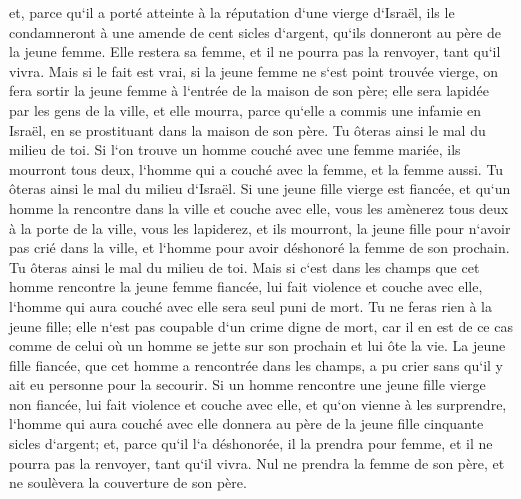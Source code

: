 \verse et, parce qu`il a porté atteinte à la réputation d`une vierge d`Israël, ils le condamneront à une amende de cent sicles d`argent, qu`ils donneront au père de la jeune femme. Elle restera sa femme, et il ne pourra pas la renvoyer, tant qu`il vivra. 
\verse Mais si le fait est vrai, si la jeune femme ne s`est point trouvée vierge, 
\verse on fera sortir la jeune femme à l`entrée de la maison de son père; elle sera lapidée par les gens de la ville, et elle mourra, parce qu`elle a commis une infamie en Israël, en se prostituant dans la maison de son père. Tu ôteras ainsi le mal du milieu de toi. 
\verse Si l`on trouve un homme couché avec une femme mariée, ils mourront tous deux, l`homme qui a couché avec la femme, et la femme aussi. Tu ôteras ainsi le mal du milieu d`Israël. 
\verse Si une jeune fille vierge est fiancée, et qu`un homme la rencontre dans la ville et couche avec elle, 
\verse vous les amènerez tous deux à la porte de la ville, vous les lapiderez, et ils mourront, la jeune fille pour n`avoir pas crié dans la ville, et l`homme pour avoir déshonoré la femme de son prochain. Tu ôteras ainsi le mal du milieu de toi. 
\verse Mais si c`est dans les champs que cet homme rencontre la jeune femme fiancée, lui fait violence et couche avec elle, l`homme qui aura couché avec elle sera seul puni de mort. 
\verse Tu ne feras rien à la jeune fille; elle n`est pas coupable d`un crime digne de mort, car il en est de ce cas comme de celui où un homme se jette sur son prochain et lui ôte la vie. 
\verse La jeune fille fiancée, que cet homme a rencontrée dans les champs, a pu crier sans qu`il y ait eu personne pour la secourir. 
\verse Si un homme rencontre une jeune fille vierge non fiancée, lui fait violence et couche avec elle, et qu`on vienne à les surprendre, 
\verse l`homme qui aura couché avec elle donnera au père de la jeune fille cinquante sicles d`argent; et, parce qu`il l`a déshonorée, il la prendra pour femme, et il ne pourra pas la renvoyer, tant qu`il vivra. 
\verse Nul ne prendra la femme de son père, et ne soulèvera la couverture de son père. 

\chapter{}

